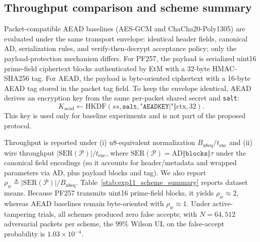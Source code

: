 \subsection{Throughput comparison and scheme summary}

Packet-compatible AEAD baselines (AES-GCM and ChaCha20-Poly1305) are evaluated under the same transport
envelope: identical header fields, canonical $\mathrm{AD}$, serialization rules, and verify-then-decrypt
acceptance policy; only the payload-protection mechanism differs. For PF257, the payload is serialized
uint16 prime-field ciphertext blocks authenticated by EtM with a 32-byte HMAC-SHA256 tag. For AEAD, the
payload is byte-oriented ciphertext with a 16-byte AEAD tag stored in the packet tag field. To keep the
envelope identical, AEAD derives an encryption key from the same per-packet shared secret and
\texttt{salt}:
\[
K_{\mathrm{aead}} \leftarrow \mathrm{HKDF}(ss,\texttt{salt},\texttt{"AEADKEY|"}\Vert\mathrm{ctx},32).
\]
This key is used only for baseline experiments and is not part of the proposed protocol.

Throughput is reported under (i) u8-equivalent normalization $B_{\mathrm{u8eq}}/t_{\mathrm{enc}}$ and
(ii) wire throughput $|\mathrm{SER}(\mathcal{P})|/t_{\mathrm{enc}}$, where $\mathrm{SER}(\mathcal{P})=\mathrm{AD}\Vert\texttt{blocks}\Vert\tau$ under the canonical field encodings (so it accounts for header/metadata and wrapped parameters via $\mathrm{AD}$, plus payload blocks and tag). We also report
$\rho_w \triangleq |\mathrm{SER}(\mathcal{P})|/B_{\mathrm{u8eq}}$.
Table~\ref{stab:exp11_scheme_summary} reports dataset means. Because PF257 transmits uint16 prime-field
blocks, it yields $\rho_w\approx 2$, whereas AEAD baselines remain byte-oriented with $\rho_w\approx 1$.
Under active-tampering trials, all schemes produced zero false accepts; with $N=64{,}512$ adversarial
packets per scheme, the 99\% Wilson UL on the false-accept probability is $1.03\times 10^{-4}$.


